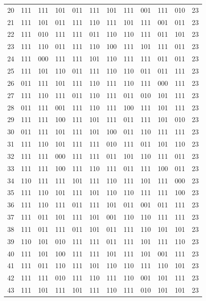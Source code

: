 \begin{longtable}{r*{10}{c}r}
20 & 111 & 111 & 101 & 011 & 111 & 101 & 111 & 001 & 111 & 010 & 23\\
21 & 111 & 101 & 011 & 111 & 110 & 111 & 101 & 111 & 001 & 011 & 23\\
22 & 111 & 010 & 111 & 111 & 011 & 110 & 110 & 111 & 011 & 101 & 23\\
23 & 111 & 110 & 011 & 111 & 110 & 100 & 111 & 101 & 111 & 011 & 23\\
24 & 111 & 000 & 111 & 111 & 101 & 110 & 111 & 111 & 011 & 011 & 23\\
25 & 111 & 101 & 110 & 011 & 111 & 110 & 110 & 011 & 011 & 111 & 23\\
26 & 011 & 111 & 101 & 111 & 110 & 111 & 110 & 111 & 000 & 111 & 23\\
27 & 111 & 110 & 111 & 011 & 110 & 111 & 011 & 010 & 101 & 111 & 23\\
28 & 011 & 111 & 001 & 111 & 110 & 111 & 100 & 111 & 101 & 111 & 23\\
29 & 111 & 111 & 100 & 111 & 101 & 111 & 011 & 111 & 101 & 010 & 23\\
30 & 011 & 111 & 101 & 111 & 101 & 100 & 011 & 110 & 111 & 111 & 23\\
31 & 111 & 110 & 101 & 111 & 111 & 010 & 111 & 011 & 101 & 110 & 23\\
32 & 111 & 111 & 000 & 111 & 111 & 011 & 101 & 110 & 111 & 011 & 23\\
33 & 111 & 111 & 100 & 111 & 110 & 111 & 011 & 111 & 100 & 011 & 23\\
34 & 110 & 111 & 111 & 101 & 111 & 110 & 111 & 101 & 111 & 000 & 23\\
35 & 111 & 110 & 101 & 111 & 101 & 110 & 110 & 111 & 111 & 100 & 23\\
36 & 111 & 110 & 111 & 011 & 111 & 101 & 011 & 001 & 011 & 111 & 23\\
37 & 111 & 011 & 101 & 111 & 101 & 001 & 110 & 110 & 111 & 111 & 23\\
38 & 111 & 011 & 111 & 011 & 101 & 011 & 111 & 110 & 101 & 101 & 23\\
39 & 110 & 101 & 010 & 111 & 111 & 011 & 111 & 101 & 111 & 110 & 23\\
40 & 111 & 101 & 100 & 111 & 111 & 101 & 111 & 101 & 001 & 111 & 23\\
41 & 111 & 011 & 110 & 111 & 101 & 110 & 110 & 111 & 110 & 101 & 23\\
42 & 111 & 111 & 010 & 111 & 110 & 111 & 110 & 001 & 101 & 111 & 23\\
43 & 111 & 101 & 111 & 101 & 111 & 110 & 111 & 010 & 101 & 101 & 23\\

\end{longtable}
